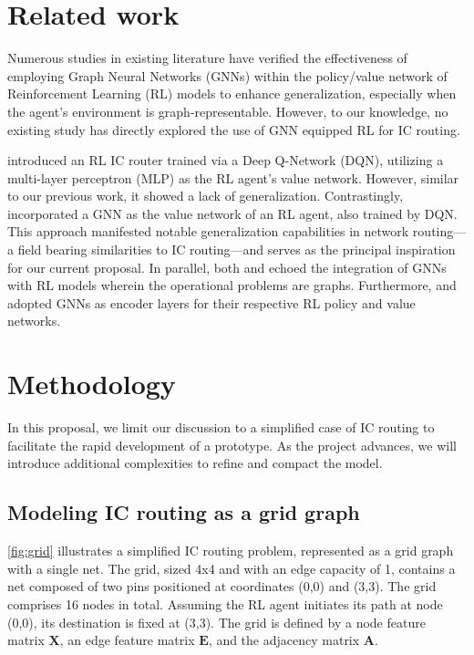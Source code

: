 \documentclass[letterpaper]{article}
\begin{document}



\section{Related work}
Numerous studies in existing literature have verified the effectiveness of employing Graph Neural Networks (GNNs) within the policy/value network of Reinforcement Learning (RL) models to enhance generalization, especially when the agent’s environment is graph-representable. However, to our knowledge, no existing study has directly explored the use of GNN equipped RL for IC routing.

\cite{Liao2020} introduced an RL IC router trained via a Deep Q-Network (DQN), utilizing a multi-layer perceptron (MLP) as the RL agent's value network. However, similar to our previous work, it showed a lack of generalization. Contrastingly, \cite{Almasan2022} incorporated a GNN as the value network of an RL agent, also trained by DQN. This approach manifested notable generalization capabilities in network routing—a field bearing similarities to IC routing—and serves as the principal inspiration for our current proposal. In parallel, both \cite{Chen2023} and \cite{Wang2018} echoed the integration of GNNs with RL models wherein the operational problems are graphs. Furthermore, \cite{Mirhoseini2021} and \cite{Yue2022} adopted GNNs as encoder layers for their respective RL policy and value networks.

    
\section{Methodology}
In this proposal, we limit our discussion to a simplified case of IC routing to facilitate the rapid development of a prototype. As the project advances, we will introduce additional complexities to refine and compact the model.

\subsection{Modeling IC routing as a grid graph}
\autoref{fig:grid} illustrates a simplified IC routing problem, represented as a grid graph with a single net. The grid, sized 4x4 and with an edge capacity of 1, contains a net composed of two pins positioned at coordinates (0,0) and (3,3). The grid comprises 16 nodes in total. Assuming the RL agent initiates its path at node (0,0), its destination is fixed at (3,3). The grid is defined by a node feature matrix $\mathbf{X}$, an edge feature matrix $\mathbf{E}$, and the adjacency matrix $\mathbf{A}$.
\end{document}
